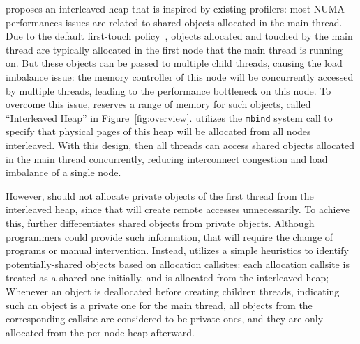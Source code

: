 
\NA{} proposes an interleaved heap that is inspired by existing profilers\cite{XULIU, MemProf}: most NUMA performances issues are related to shared objects allocated in the main thread. Due to the default first-touch policy~\cite{lameter2013numa, diener2015locality}, objects allocated and touched by the main thread are typically allocated in the first node that the main thread is running on. But these objects can be passed to multiple child threads, causing the load imbalance issue: the memory controller of this node will be concurrently accessed by multiple threads, leading to the performance bottleneck on this node. To overcome this issue, \NA{} reserves a range of memory for such objects, called ``Interleaved Heap'' in Figure~\ref{fig:overview}. \NA{} utilizes the \texttt{mbind} system call to specify that physical pages of this heap will be allocated from all nodes interleaved. With this design, then all threads can access shared objects allocated in the main thread concurrently, reducing interconnect congestion and load imbalance of a single node. 

However, \NA{} should not allocate private objects of the first thread from the interleaved heap, since that will create remote accesses unnecessarily. To achieve this, \NM{} further differentiates shared objects from private objects. Although programmers could provide such information, that will require the change of programs or manual intervention. Instead, \NM{} utilizes a simple heuristics to identify potentially-shared objects based on allocation callsites: each allocation callsite is treated as a shared one initially, and is allocated from the interleaved heap; Whenever an object is deallocated before creating children threads, indicating such an object is a private one for the main thread, all objects from the corresponding callsite are considered to be private ones, and they are only allocated from the per-node heap afterward. 

